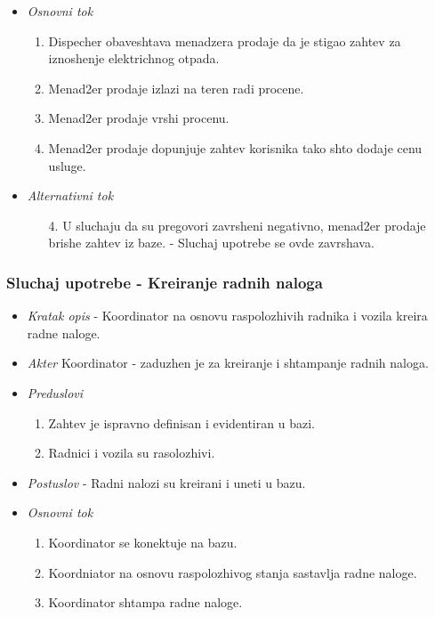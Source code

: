 \documentclass[10 pt]{article}
\begin{document}
\begin{itemize}
			\item\textit{Osnovni tok}
				\begin{enumerate} 
					\item Dispecher obaveshtava menadzera prodaje da je stigao zahtev za iznoshenje elektrichnog otpada.
					\item Menad2er prodaje izlazi na teren radi procene.
					\item Menad2er prodaje vrshi procenu.
					\item Menad2er prodaje dopunjuje zahtev korisnika tako shto dodaje cenu usluge.
				\end{enumerate}
			
			\item\textit{Alternativni tok}
				\begin{enumerate}
					\item [4.] U sluchaju da su pregovori zavrsheni negativno, menad2er prodaje brishe zahtev iz baze. - Sluchaj upotrebe se ovde zavrshava.
				\end{enumerate}
			
		\end{itemize}
	
	
	\subsubsection{Sluchaj upotrebe - Kreiranje radnih naloga}
	
		\begin{itemize}
		
			\item\textit{Kratak opis} - Koordinator na osnovu raspolozhivih radnika i vozila kreira radne naloge.
			
			\item\textit{Akter} Koordinator - zaduzhen je za kreiranje i shtampanje radnih naloga.
			
			\item\textit{Preduslovi}
				\begin{enumerate}
					\item Zahtev je ispravno definisan i evidentiran u bazi.
					\item Radnici i vozila su rasolozhivi.
				\end{enumerate}
			
			\item\textit{Postuslov} - Radni nalozi su kreirani i uneti u bazu.
			
			\item\textit{Osnovni tok}
				\begin{enumerate}
					\item Koordinator se konektuje na bazu.
					\item Koordniator na osnovu raspolozhivog stanja sastavlja radne naloge.
					\item Koordinator shtampa radne naloge.
				\end{enumerate}
			
		\end{itemize}
	
\end{document}

